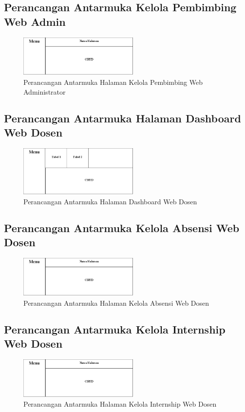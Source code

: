 \subsection{Perancangan Antarmuka Kelola Pembimbing  Web Admin}
	\begin{figure}[H]
		\includegraphics[width=6cm]{figures/diagram/image114.png}
		\centering
		\caption{Perancangan Antarmuka Halaman Kelola Pembimbing  Web Administrator}
	\end{figure}
\subsection{Perancangan Antarmuka Halaman Dashboard Web Dosen}
	\begin{figure}[H]
		\includegraphics[width=6cm]{figures/diagram/image115.png}
		\centering
		\caption{Perancangan Antarmuka Halaman Dashboard Web Dosen}
	\end{figure}
\subsection{Perancangan Antarmuka Kelola Absensi Web Dosen}
	\begin{figure}[H]
		\includegraphics[width=6cm]{figures/diagram/image114.png}
		\centering
		\caption{Perancangan Antarmuka Halaman Kelola Absensi Web Dosen}
	\end{figure}
\subsection{Perancangan Antarmuka Kelola Internship Web Dosen}
	\begin{figure}[H]
		\includegraphics[width=6cm]{figures/diagram/image114.png}
		\centering
		\caption{Perancangan Antarmuka Halaman Kelola Internship Web Dosen}
	\end{figure}
